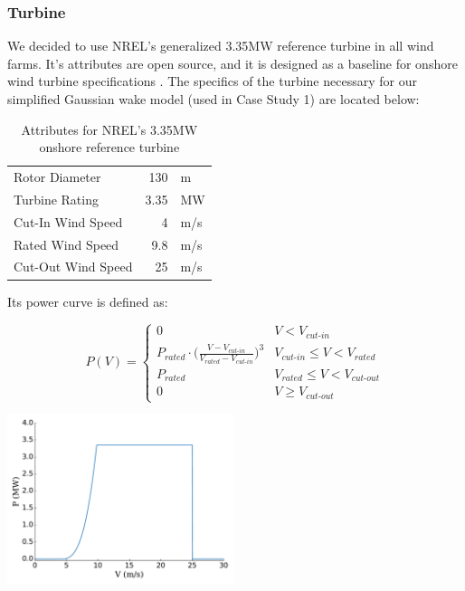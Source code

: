 \subsubsection{Turbine} \label{sec:turb}
	We decided to use NREL's generalized 3.35MW reference turbine in all wind farms.
	It's attributes are open source, and it is designed as a baseline for onshore wind turbine specifications \cite{NREL335MW}.
	The specifics of the turbine necessary for our simplified Gaussian wake model (used in Case Study 1) are located below:

	\begin{table}
		\begin{center}
			\caption{Attributes for NREL's 3.35MW onshore reference turbine}
			\label{tab:335MW}
			\begin{tabular}{@{}lrl@{}}
			\toprule
				Rotor Diameter & 130 & m \\ 
				Turbine Rating & 3.35 & MW \\ 
				Cut-In Wind Speed & 4 & m/s \\ 
				Rated Wind Speed & 9.8 & m/s \\ 
				Cut-Out Wind Speed & 25 & m/s \\
			\bottomrule
			\end{tabular}
		\end{center}
	\end{table}
		
	\noindent Its power curve is defined as:   

	\begin{minipage}{0.53\textwidth}
		\begin{equation*}
			P(V) = 
			\begin{cases} 
				0 & V < V_{\textit{cut-in}} \\
				P_{\textit{rated}}\cdot\bigg(\frac{V-V_{\textit{cut-in}}}{V_{\textit{rated}}-V_{\textit{cut-in}}}\bigg)^3 & V_{\textit{cut-in}}\leq V < V_{\textit{rated}} \\
				P_{\textit{rated}} & V_{\textit{rated}} \leq V < V_{\textit{cut-out}} \\
				0 & V \geq V_{\textit{cut-out}}
			\end{cases}
		\label{eq:power}
		\end{equation*}
	\end{minipage}\quad
	\begin{minipage}{0.53\textwidth}
		\includegraphics[width=2.6in]{./figures/iea37-335mw-pcurve.pdf}
	\end{minipage}

